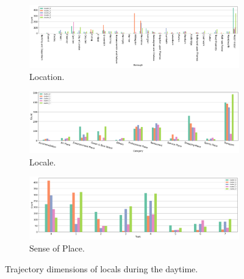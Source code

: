 \documentclass{article}
\theoremstyle{remark}
\begin{document}
\begin{figure}[!h]

\centering
\begin{subfigure}{0.6\textheight}
\centering
\includegraphics[width=1\linewidth]{figures/traj_location_daytime_locals.png}
\caption{Location.}
\label{fig:traj_location_daytime_locals}
\end{subfigure}
\begin{subfigure}{0.6\textheight}
\centering
\includegraphics[width=1\linewidth]{figures/traj_locale_daytime_locals.png}
\caption{Locale.}
\label{fig:traj_locale_daytime_locals}
\end{subfigure}
\begin{subfigure}{0.6\textheight}
\centering
\includegraphics[width=1\linewidth]{figures/traj_sense_daytime_locals.png}
\caption{Sense of Place.}
\label{fig:traj_sense_daytime_locals}
\end{subfigure}

\caption{Trajectory dimensions of locals during the daytime.}
\label{fig:traj_dimension_daytime_locas}
\end{figure}
\end{document}
